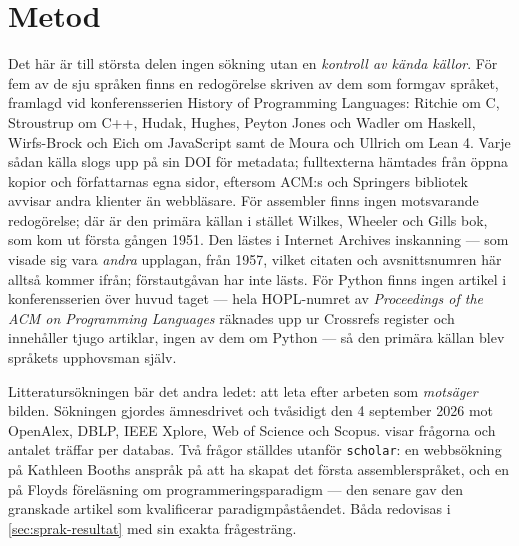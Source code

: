 \section{Metod}
\label{sec:sprak-metod}

Det här är till största delen ingen sökning utan en \emph{kontroll av kända
källor}.  För fem av de sju språken finns en redogörelse skriven av dem som
formgav språket, framlagd vid konferensserien \foreignlanguage{english}{History
of Programming Languages}: Ritchie om C\autocite{Ritchie1993C}, Stroustrup
om C++\autocite{Stroustrup1993Cpp}, Hudak, Hughes, Peyton Jones och Wadler
om Haskell\autocite{Hudak2007Haskell}, Wirfs-Brock och Eich om
JavaScript\autocite{WirfsBrock2020JavaScript} samt de Moura och Ullrich om
Lean 4\autocite{Moura2021Lean4}.  Varje sådan källa slogs upp på sin DOI
för metadata; fulltexterna hämtades från öppna kopior och
författarnas egna sidor, eftersom ACM:s och Springers bibliotek avvisar
andra klienter än webbläsare.  För assembler finns ingen motsvarande
redogörelse; där är den primära källan i stället Wilkes, Wheeler och
Gills bok, som kom ut första gången
1951\autocite{Wilkes1951Preparation}.  Den lästes i Internet Archives
inskanning --- som visade sig vara \emph{andra} upplagan, från 1957,
vilket citaten och avsnittsnumren här alltså kommer ifrån; förstautgåvan
har inte lästs.  För Python finns
ingen artikel i konferensserien över huvud taget --- hela HOPL-numret av
\emph{Proceedings of the ACM on Programming Languages} räknades upp ur
Crossrefs register och innehåller tjugo artiklar, ingen av dem om Python
--- så den primära källan blev språkets upphovsman
själv\autocite{VanRossum1991Python,VanRossumCWI}.

Litteratursökningen bär det andra ledet: att leta efter arbeten som
\emph{motsäger} bilden.  Sökningen gjordes ämnesdrivet och tvåsidigt den 4
september 2026 mot OpenAlex, DBLP, IEEE Xplore, Web of Science och Scopus.
 visar frågorna och antalet träffar per databas.
Två frågor ställdes utanför \texttt{scholar}: en webbsökning på Kathleen
Booths anspråk på att ha skapat det första assemblerspråket, och en på
Floyds föreläsning om programmeringsparadigm --- den senare gav den
granskade artikel som kvalificerar
paradigmpåståendet\autocite{Michaelson2020Paradigms}.  Båda redovisas i
\cref{sec:sprak-resultat} med sin exakta frågesträng.

